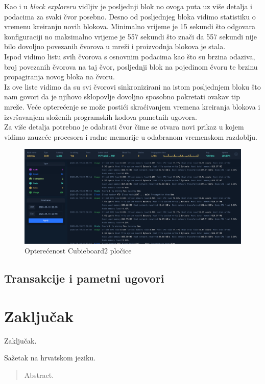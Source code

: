 \documentclass[times, utf8, zavrsni]{fer}
\begin{document}
Kao i u \emph{block exploreru} vidljiv je posljednji blok no ovoga puta uz više detalja i podacima za svaki čvor posebno.
Desno od posljednjeg bloka vidimo statistiku o vremenu kreiranju novih blokova. Minimalno vrijeme je 15 sekundi što odgovara konfiguraciji
no maksimalno vrijeme je 557 sekundi što znači da 557 sekundi nije bilo dovoljno povezanih čvorova u mreži i proizvodnja blokova je stala. \\
Ispod vidimo listu svih čvorova s osnovnim podacima kao što su brzina odaziva, broj povezanih čvorova na taj čvor, posljednji blok na pojedinom
čvoru te brzinu propagiranja novog bloka na čvoru. \\
Iz ove liste vidimo da su svi čvorovi sinkronizirani na istom posljednjem bloku što nam govori da je njihovo sklopovlje dovoljno sposobno
pokretati ovakav tip mreže. Veće opterećenje se može postići skraćivanjem vremena kreiranja blokova i izvršavanjem složenih programskih
kodova pametnih ugovora. \\
Za više detalja potrebno je odabrati čvor čime se otvara novi prikaz u kojem vidimo zauzeće procesora i radne memorije u odabranom
vremenskom razdoblju.
\begin{figure}[h]
  \caption{Opterećenost Cubieboard2 pločice}
  \centering
  \includegraphics[width=\textwidth]{ethstatsCubie.png}
  \vspace{10in}
\end{figure}

\section{Transakcije i pametni ugovori}



\chapter{Zaključak}
Zaključak.





\begin{sazetak}
Sažetak na hrvatskom jeziku.

\end{sazetak}

\begin{abstract}
Abstract.

\end{abstract}
\end{document}
